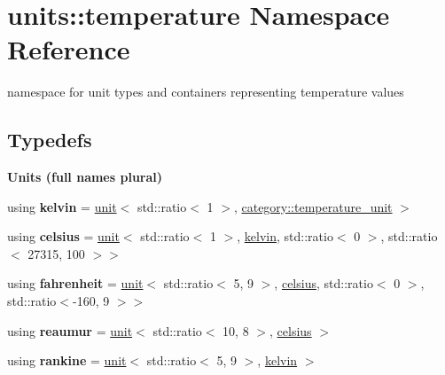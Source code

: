 \hypertarget{namespaceunits_1_1temperature}{}\section{units\+:\+:temperature Namespace Reference}
\label{namespaceunits_1_1temperature}


namespace for unit types and containers representing temperature values  


\subsection*{Typedefs}
\begin{Indent}{\bf Units (full names plural)}\par
\begin{DoxyCompactItemize}
\item 
\hypertarget{namespaceunits_1_1temperature_a2b236b554ece3df04af7c258f0100839}{}using {\bfseries kelvin} = \hyperlink{structunits_1_1unit}{unit}$<$ std\+::ratio$<$ 1 $>$, \hyperlink{namespaceunits_1_1category_a3132de15d76bba5313de2ed97f8cf950}{category\+::temperature\+\_\+unit} $>$\label{namespaceunits_1_1temperature_a2b236b554ece3df04af7c258f0100839}

\item 
\hypertarget{namespaceunits_1_1temperature_a6e9fa74ae60e2f40ff1ccacb940a0169}{}using {\bfseries celsius} = \hyperlink{structunits_1_1unit}{unit}$<$ std\+::ratio$<$ 1 $>$, \hyperlink{structunits_1_1unit}{kelvin}, std\+::ratio$<$ 0 $>$, std\+::ratio$<$ 27315, 100 $>$$>$\label{namespaceunits_1_1temperature_a6e9fa74ae60e2f40ff1ccacb940a0169}

\item 
\hypertarget{namespaceunits_1_1temperature_a4ae1f69d2ba7d2380c35867dd84e1119}{}using {\bfseries fahrenheit} = \hyperlink{structunits_1_1unit}{unit}$<$ std\+::ratio$<$ 5, 9 $>$, \hyperlink{structunits_1_1unit}{celsius}, std\+::ratio$<$ 0 $>$, std\+::ratio$<$-\/160, 9 $>$$>$\label{namespaceunits_1_1temperature_a4ae1f69d2ba7d2380c35867dd84e1119}

\item 
\hypertarget{namespaceunits_1_1temperature_af6743ed0e89a0fab90be4b9cd84557fa}{}using {\bfseries reaumur} = \hyperlink{structunits_1_1unit}{unit}$<$ std\+::ratio$<$ 10, 8 $>$, \hyperlink{structunits_1_1unit}{celsius} $>$\label{namespaceunits_1_1temperature_af6743ed0e89a0fab90be4b9cd84557fa}

\item 
\hypertarget{namespaceunits_1_1temperature_a57c80659d865da2d32be08e10afdf005}{}using {\bfseries rankine} = \hyperlink{structunits_1_1unit}{unit}$<$ std\+::ratio$<$ 5, 9 $>$, \hyperlink{structunits_1_1unit}{kelvin} $>$\label{namespaceunits_1_1temperature_a57c80659d865da2d32be08e10afdf005}

\end{DoxyCompactItemize}
\end{Indent}
